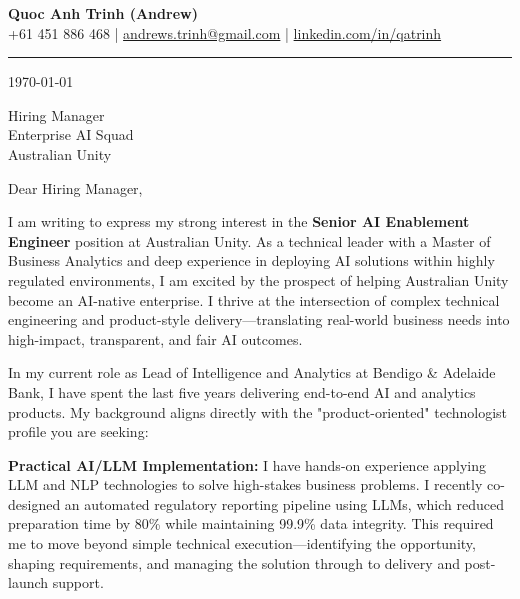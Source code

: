 \documentclass[11pt, a4paper]{article}
\begin{document}
\begin{center}
    {\LARGE \textbf{Quoc Anh Trinh (Andrew)}}\\[4pt]
    {\small
        +61 451 886 468 \quad|\quad
        \href{mailto:andrews.trinh@gmail.com}{andrews.trinh@gmail.com} \quad|\quad
        \href{https://www.linkedin.com/in/qatrinh}{linkedin.com/in/qatrinh}
    }
\end{center}

\vspace{4pt}
\hrule
\vspace{14pt}

\today

\vspace{8pt}

Hiring Manager\\
Enterprise AI Squad\\
Australian Unity

\vspace{10pt}

Dear Hiring Manager,

I am writing to express my strong interest in the \textbf{Senior AI Enablement Engineer} position at Australian Unity. As a technical leader with a Master of Business Analytics and deep experience in deploying AI solutions within highly regulated environments, I am excited by the prospect of helping Australian Unity become an AI-native enterprise. I thrive at the intersection of complex technical engineering and product-style delivery—translating real-world business needs into high-impact, transparent, and fair AI outcomes.

In my current role as Lead of Intelligence and Analytics at Bendigo \& Adelaide Bank, I have spent the last five years delivering end-to-end AI and analytics products. My background aligns directly with the "product-oriented" technologist profile you are seeking:

\textbf{Practical AI/LLM Implementation:}
I have hands-on experience applying LLM and NLP technologies to solve high-stakes business problems. I recently co-designed an automated regulatory reporting pipeline using LLMs, which reduced preparation time by 80\% while maintaining 99.9\% data integrity. This required me to move beyond simple technical execution—identifying the opportunity, shaping requirements, and managing the solution through to delivery and post-launch support.
\end{document}
